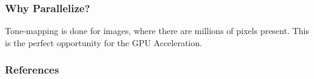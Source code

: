 \documentclass{beamer}
\begin{document}
\begin{frame}
    \frametitle{Why Parallelize?}
    Tone-mapping is done for images, where there are millions of pixels present.
    This is the perfect opportunity for the GPU Acceleration.
    

\end{frame}

\begin{frame}
    \frametitle{References}
    \begin{thebibliography}{00}
    \end{thebibliography}    

\end{frame}
\end{document}

